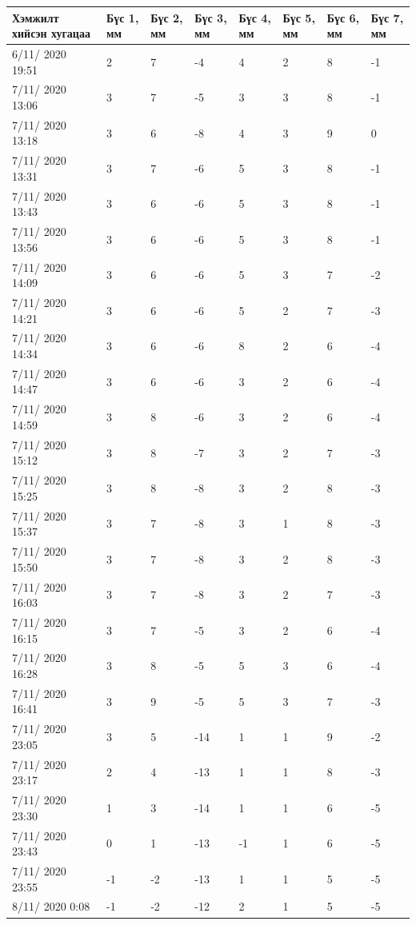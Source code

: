 \begin{table}[h]
    \centering
    \begin{tabular}{|p{3cm}|p{1cm}|p{1cm}|p{1cm}|p{1cm}|p{1cm}|p{1cm}|p{1cm}|}
         \hline
     Хэмжилт хийсэн хугацаа & Бүс 1, мм&	Бүс 2, мм&	Бүс 3, мм&	Бүс 4, мм&	Бүс 5, мм&	Бүс 6, мм&	Бүс 7, мм  \\ \hline
6/11/ 2020 19:51&	2&	7&	-4&	4&	2&	8&	-1 \\ \hline
7/11/ 2020 13:06&	3&	7&	-5&	3&	3&	8&	-1 \\ \hline
7/11/ 2020 13:18&	3&	6&	-8&	4&	3&	9&	0 \\ \hline
7/11/ 2020 13:31&	3&	7&	-6&	5&	3&	8&	-1 \\ \hline
7/11/ 2020 13:43&	3&	6&	-6&	5&	3&	8&	-1 \\ \hline
7/11/ 2020 13:56&	3&	6&	-6&	5&	3&	8&	-1 \\ \hline
7/11/ 2020 14:09&	3&	6&	-6&	5&	3&	7&	-2 \\ \hline
7/11/ 2020 14:21&	3&	6&	-6&	5&	2&	7&	-3 \\ \hline
7/11/ 2020 14:34&	3&	6&	-6&	8&	2&	6&	-4 \\ \hline
7/11/ 2020 14:47&	3&	6&	-6&	3&	2&	6&	-4 \\ \hline
7/11/ 2020 14:59&	3&	8&	-6&	3&	2&	6&	-4 \\ \hline
7/11/ 2020 15:12&	3&	8&	-7&	3&	2&	7&	-3 \\ \hline
7/11/ 2020 15:25&	3&	8&	-8&	3&	2&	8&	-3 \\ \hline
7/11/ 2020 15:37&	3&	7&	-8&	3&	1&	8&	-3 \\ \hline
7/11/ 2020 15:50&	3&	7&	-8&	3&	2&	8&	-3 \\ \hline
7/11/ 2020 16:03&	3&	7&	-8&	3&	2&	7&	-3 \\ \hline
7/11/ 2020 16:15&	3&	7&	-5&	3&	2&	6&	-4 \\ \hline
7/11/ 2020 16:28&	3&	8&	-5&	5&	3&	6&	-4 \\ \hline
7/11/ 2020 16:41&	3&	9&	-5&	5&	3&	7&	-3 \\ \hline
7/11/ 2020 23:05&	3&	5&	-14&1&	1&	9&	-2 \\ \hline
7/11/ 2020 23:17&	2&	4&	-13&1&	1&	8&	-3 \\ \hline
7/11/ 2020 23:30&	1&	3&	-14&1&	1&	6&	-5 \\ \hline
7/11/ 2020 23:43&	0&	1&	-13&-1&	1&	6&	-5 \\ \hline
7/11/ 2020 23:55&	-1&-2&	-13&1&	1&	5&	-5 \\ \hline
8/11/ 2020 0:08&-1&	-2&	-12&	2&	1&	5&	-5 \\ \hline

\end{tabular}
\end{table}
